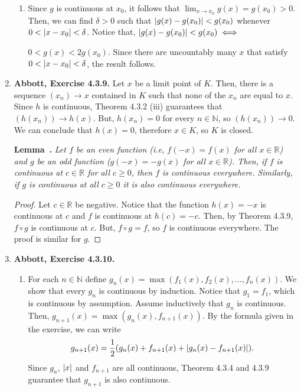 \documentclass{article}
\newcounter{lemmaCounter}
\newenvironment{shortlemma}{\refstepcounter{lemmaCounter}
\noindent\textbf{Lemma~\thelemmaCounter.}\em}
\DeclarePairedDelimiter\abs{\lvert}{\rvert}
\newcommand{\N}{\mathbb{N}}
\newcommand{\R}{\mathbb{R}}
\newcommand{\exc}[2][Abbott]{\item \textbf{#1, Exercise #2.}}
\let\oldmax\max
\renewcommand{\max}[1]{\oldmax \left( #1 \right)}
\begin{document}
\begin{enumerate}
\begin{enumerate}
        \item Since $g$ is continuous at $x_0$, it follows that $\lim_{x \to x_0} g(x) = g(x_0) > 0$. Then, we can find $\delta > 0$ such that $\abs{g(x)-g(x_0)} < g(x_0)$ whenever $0 < \abs{x-x_0} < \delta$. Notice that,  $\abs{g(x)-g(x_0)} < g(x_0) \iff$
        
        \noindent $0 < g(x) < 2g(x_0)$. Since there are uncountably many $x$ that satisfy $0 < \abs{x-x_0} < \delta$, the result follows.
    \end{enumerate}
    
    \exc{4.3.9}
    Let $x$ be a limit point of $K$. Then, there is a sequence $(x_n) \to x$ contained in $K$ such that none of the $x_n$ are equal to $x$. Since $h$ is continuous, Theorem 4.3.2 (iii) guarantees that $(h(x_n)) \to h(x)$. But, $h(x_n) = 0$ for every $n \in \N$, so $(h(x_n)) \to 0$. We can conclude that $h(x) = 0$, therefore $x \in K$, so $K$ is closed.
    
    \begin{shortlemma} \label{lem_evenOddContinuous}
        Let $f$ be an even function (i.e, $f(-x) = f(x)$ for all $x \in \R$) and $g$ be an odd function ($g(-x) = -g(x)$ for all $x \in \R$). Then, if $f$ is continuous at $c \in \R$ for all $c \geq 0$, then $f$ is continuous everywhere. Similarly, if $g$ is continuous at all $c \geq 0$ it is also continuous everywhere.
    \end{shortlemma}
    
    \begin{proof}
         Let $c \in \R$ be negative. Notice that the function $h(x)=-x$ is continuous at $c$ and $f$ is continuous at $h(c)=-c$. Then, by Theorem 4.3.9, $f \circ g$ is continuous at $c$. But, $f \circ g = f$, so $f$ is continuous everywhere. The proof is similar for $g$.
    \end{proof}
    
    \exc{4.3.10}
    \begin{enumerate}
        \item For each $n \in \N$ define $g_n(x) = \max{f_1(x), f_2(x), \dots, f_n(x)}$. We show that every $g_n$ is continuous by induction. Notice that $g_1 = f_1$, which is continuous by assumption. Assume inductively that $g_n$ is continuous. Then, $g_{n+1}(x) = \max{g_n(x),f_{n+1}(x)}$. By the formula given in the exercise, we can write 
        $$ g_{n+1}(x) = \frac{1}{2} (g_n(x)+f_{n+1}(x) + \abs{g_n(x)-f_{n+1}(x)}).$$ Since $g_n$, $\abs{x}$ and $f_{n+1}$ are all continuous, Theorem 4.3.4 and 4.3.9 guarantee that $g_{n+1}$ is also continuous.
        

\end{enumerate}
\end{enumerate}
\end{document}
